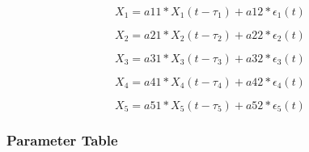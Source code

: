 \begin{equation}
X_1= a11*X_1(t- \tau_1) + a12*\epsilon_1(t)
\end{equation}

\begin{equation}
X_2= a21*X_2(t- \tau_2) + a22*\epsilon_2(t)
\end{equation}

\begin{equation}
X_3= a31*X_3(t- \tau_3) + a32*\epsilon_3(t)
\end{equation}

\begin{equation}
X_4= a41*X_4(t- \tau_4) + a42*\epsilon_4(t)
\end{equation}

\begin{equation}
X_5= a51*X_5(t- \tau_5) + a52*\epsilon_5(t)
\end{equation}


\subsubsection{Parameter Table}

